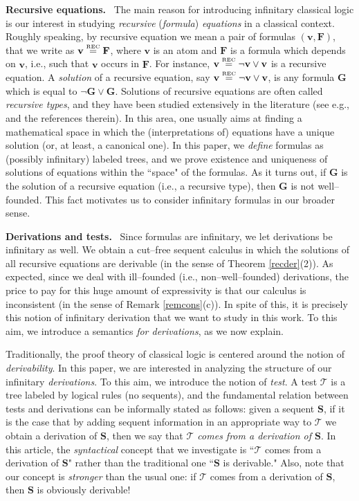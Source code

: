 \documentclass[copyright,creativecommons]{eptcs}
\def\eg{e.g., }
\def\ie{i.e., }
\newcommand{\eqrec}{\stackrel{\text{\tiny \textnormal{REC}}}{=}}
\newcommand{\cT}{\mathcal{T}}
\newcommand{\bF}{\mathbf{F}}
\newcommand{\bG}{\mathbf{G}}
\newcommand{\bS}{\mathbf{S}}
\newcommand{\bbv}{\mathbf{v}}
\theoremstyle{definition}
\begin{document}
 \vspace{-0.35cm}

 \noindent \textbf{Recursive equations.} \
 The main  reason for introducing infinitary classical logic
 is our interest in studying \emph{recursive}
 (\emph{formula}) \emph{equations} in a classical context.
 Roughly speaking, by recursive  equation we  mean  a
pair of formulas $(\bbv,\bF)$,  that we write as  $\bbv \eqrec \bF$, where
$\bbv$ is an atom and  $\bF$ is a formula which depends on $\bbv$, \ie such that $\bbv$ occurs in $\bF$. For instance,
$\bbv \eqrec \neg \bbv \vee \bbv$ is a recursive equation.
  A \emph{solution} of a recursive equation, say $\bbv \eqrec \neg \bbv \vee \bbv$,
 is any formula $\bG$ which is equal   to $\neg \bG \vee \bG$.
  Solutions of recursive equations are often called
 \emph{recursive types},
 and they have been studied extensively  in the literature
 (see \eg \cite{coppo,MelVou} and the references therein).
In this area,  one usually aims at finding a   mathematical space  in which the (interpretations of) equations
have a unique solution (or, at least, a canonical one).
In this paper,
we \emph{define} formulas as (possibly infinitary) labeled trees,
and we prove  existence and uniqueness of  solutions of equations
within the ``space" of the formulas.
As it turns out, if $\bG$ is the solution of a recursive equation (\ie a recursive type), then $\bG$
is not  well--founded. This
fact motivates us to consider  infinitary formulas in our broader sense. \\
\vspace{-0.35cm}

 \noindent \textbf{Derivations and tests.} \
 Since formulas are infinitary, we  let derivations  be infinitary as well.
We obtain a cut--free sequent
calculus in which the
solutions of all recursive equations
are derivable (in the sense of Theorem \ref{recder}(2)).  As expected, since we deal with
ill--founded (\ie non--well--founded) derivations,
 the price to pay for this huge amount of expressivity is that our calculus
is inconsistent (in the  sense of Remark \ref{remcons}(c)).
In spite of this,  it is precisely
this notion of infinitary  derivation that we want
to study in this work.  To this aim, we introduce a semantics \emph{for derivations},  as we now explain.

Traditionally, the proof theory of classical logic is centered around the notion of  \emph{derivability}.
In this paper, we are interested in analyzing
the structure of  our infinitary \emph{derivations}. To this aim, we introduce the notion of \emph{test}.  A {test} $\cT$ is a
 tree labeled by logical rules
(no sequents), and the fundamental relation between tests and derivations can be informally stated as follows: given a sequent $\bS$,
 if it is the case that by adding sequent information in an appropriate way to $\cT$  we obtain  a  derivation of  $\bS$, then
 we say that
  \emph{$\cT$ comes from a derivation
of   \/$\bS$}.
In this article,  the  \emph{syntactical} concept that we  investigate is ``$\cT$ comes from a derivation
of \/$\bS$"  rather than the traditional one ``$\bS$ is derivable."
Also, note that our concept is \emph{stronger} than the usual  one:
 if $\cT$ comes from a derivation of $\bS$, then $\bS$ is obviously derivable!
\end{document}
